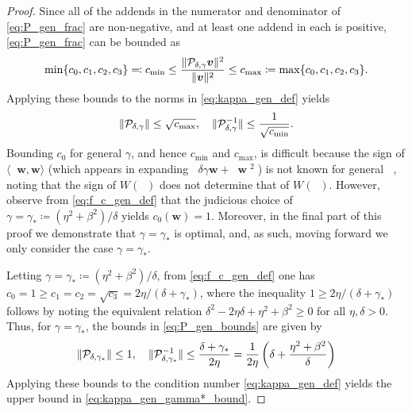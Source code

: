 \documentclass[a4paper,10pt]{article}
\DeclareMathOperator{\cL}{\widehat{\mathcal{L}}}
\DeclareMathOperator{\cLs}{\widehat{\mathcal{L}}^2}
\DeclareMathOperator{\bVert}{\big\Vert}
\begin{document}
\begin{proof}
Since all of the addends in the numerator and denominator of \eqref{eq:P_gen_frac} are non-negative, and at least one addend in each is positive, \eqref{eq:P_gen_frac} can be bounded as
\begin{align*}
\min \{ c_0, c_1, c_2, c_3 \} \eqqcolon c_{\min}
\leq
\frac{\Vert {\cal P}_{\delta,\gamma} \bm{v} \Vert^2}{\Vert \bm{v} \Vert^2} 
\leq c_{\max} 
\coloneqq \max \{ c_0, c_1, c_2, c_3 \}.
\end{align*}
Applying these bounds to the norms in \eqref{eq:kappa_gen_def} yields
\begin{align} \label{eq:P_gen_bounds}
\Vert {\cal P}_{\delta, \gamma} \Vert \leq \sqrt{c_{\max}}, 
\quad
\Vert {\cal P}_{\delta, \gamma}^{-1} \Vert \leq \frac{1}{\sqrt{c_{\min}}}.
\end{align}
%
Bounding $c_0$ for general $\gamma$, and hence $c_{\min}$ and $c_{\max}$, is
difficult because the sign of $\langle \cLs \bm{w}, \bm{w} \rangle$ (which
appears in expanding $\bVert \delta \gamma \bm{w} + \cLs \bm{w} \bVert^2$) is not
known for general $\cL$, noting that the sign of $W(\cL)$ does not determine
that of $W(\cLs)$. However, observe from \eqref{eq:f_c_gen_def} that the judicious
choice of $\gamma = \gamma_* \coloneqq (\eta^2 + \beta^2)/\delta$ yields $c_0(\bm{w}) = 1$.
Moreover, in the final part of this proof we demonstrate that
$\gamma = \gamma_*$ is optimal, and, as such, moving forward we
only consider the case $\gamma = \gamma_*$.

Letting $\gamma = \gamma_* \coloneqq (\eta^2 + \beta^2)/\delta$, from
\eqref{eq:f_c_gen_def} one has $c_0 = 1 \geq c_1 = c_2 = \sqrt{c_3} = 2
\eta/(\delta + \gamma_*)$, where the inequality $1 \geq 2 \eta/(\delta +
\gamma_*)$ follows by noting the equivalent relation $\delta^2
-2\eta\delta+\eta^2+\beta^2 \geq 0$ for all $\eta,\delta>0$. Thus, for $\gamma =
\gamma_*$, the bounds in \eqref{eq:P_gen_bounds} are given by
\begin{align}
\label{eq:P_gen_gamma*_bounds}
\Vert {\cal P}_{\delta,\gamma_*} \Vert \leq 1,
\quad
\Vert {\cal P}_{\delta,\gamma_*}^{-1} \Vert 
\leq \frac{\delta + \gamma_*}{2 \eta}
= \frac{1}{2 \eta} \left( \delta + \frac{\eta^2 + \beta^2}{\delta} \right)
\end{align}
Applying these bounds to the condition number \eqref{eq:kappa_gen_def}
yields the upper bound in \eqref{eq:kappa_gen_gamma*_bound}.


\end{proof}
\end{document}
